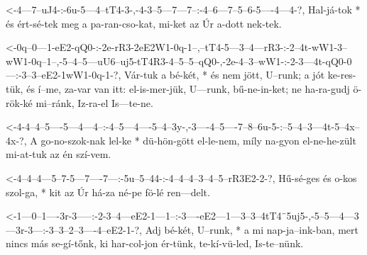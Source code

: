 


  {<-4---7--uJ4-:-6u-5---4--tT4-3-,-4-3--5---7---7--:-4--6---7--5--6-5----4---4-?,}
  {  Hal-já-tok * és ért-sé-tek meg a pa-ran-cso-kat, mi-ket az Úr a-dott nek-tek.}

  {<-0q--0---1-eE2-qQ0-:-2e-rR3-2eE2W1-0q-1--,--tT4-5---3--4---rR3-:-2--4t-wW1-3--wW1-0q--1--,-5--4--5---uU6--uj5-tT4R3-4--5--5--qQ0-,-2e-4--3--wW1-:-2-3---4t-qQ0-0---:-3--3--eE2-1wW1-0q-1-?,}
  {  Vár-tuk a bé-két, * és nem jött,  U--runk; a   jót ke-res-tük,  és í--me, za-var van itt: el-is-mer-jük, U---runk, bű-ne-in-ket;  ne ha-ra-gudj  ö-rök-ké mi--ránk, Iz-ra-el  Is---te-ne.}

  {<-4-4--4--5----5---4---4--:-4--5---4----5--4--3y-,-3----4--5----7--8--6u-5-:--5--4--3---4t-5--4x--4x-?,}
  {  A go-no-szok-nak lel-ke * dü-hön-gött el-le-nem, míly na-gyon el-ne-he-zült mi-at-tuk az én szí-vem.}

  {<-4--4--4---5--7-5---7----7---:-5u--5--44-:-4--4--4--3--4--5--rR3E2-2-?,}
  {  Hű-sé-ges és o-kos szol-ga, * kit az Úr   há-za né-pe fö-lé ren---delt.}



  {<-1---0--1----3r-3-----:-2-3--4---eE2-1---1--:-3----eE2---1---3--3--4tT4¨5uj5-,-5--5---4---3---3r-3---:-3--3--2--3----4--eE2-1-?,}
  {  Adj bé-két, U--runk, * a mi nap-ja--ink-ban, mert nincs más se-gí-tőnk,       ki har-col-jon ér-tünk, te-kí-vü-led, Is-te--nünk.}



